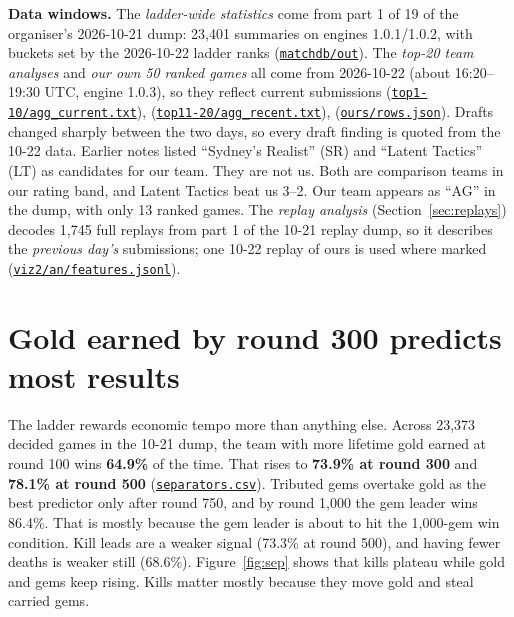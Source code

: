\documentclass[11pt,a4paper]{article}
\newcommand{\scratch}{file:///private/tmp/claude-501/-Users-tristanbasri-Desktop-Code-cambridge-battlecode-s2/b3f4cb6b-e46a-405f-957c-42c44c05c8dc/scratchpad/ladder-data}
\newcommand{\src}[2]{{\small(\href{#1}{\textcolor{cTop}{\texttt{#2}}})}}
\newcommand{\viz}{file:///private/tmp/claude-501/-Users-tristanbasri-Desktop-Code-cambridge-battlecode-s2/b3f4cb6b-e46a-405f-957c-42c44c05c8dc/scratchpad/viz2}
\begin{document}
\vspace{0.6em}
{\small\textbf{Data windows.} The \emph{ladder-wide statistics} come from part 1 of 19 of the organiser's 2026-10-21 dump: 23,401 summaries on engines 1.0.1/1.0.2, with buckets set by the 2026-10-22 ladder ranks \src{\scratch/matchdb/out/}{matchdb/out}. The \emph{top-20 team analyses} and \emph{our own 50 ranked games} all come from 2026-10-22 (about 16:20--19:30 UTC, engine 1.0.3), so they reflect current submissions \src{\scratch/top1-10/agg_current.txt}{top1-10/agg\_current.txt}, \src{\scratch/top11-20/agg_recent.txt}{top11-20/agg\_recent.txt}, \src{\scratch/ours/rows.json}{ours/rows.json}. Drafts changed sharply between the two days, so every draft finding is quoted from the 10-22 data. Earlier notes listed ``Sydney's Realist'' (SR) and ``Latent Tactics'' (LT) as candidates for our team. They are not us. Both are comparison teams in our rating band, and Latent Tactics beat us 3--2. Our team appears as ``AG'' in the dump, with only 13 ranked games. The \emph{replay analysis} (Section~\ref{sec:replays}) decodes 1,745 full replays from part 1 of the 10-21 replay dump, so it describes the \emph{previous day's} submissions; one 10-22 replay of ours is used where marked \src{\viz/an/features.jsonl}{viz2/an/features.jsonl}.}

\tableofcontents

\section{Gold earned by round 300 predicts most results}

The ladder rewards economic tempo more than anything else. Across 23,373 decided games in the 10-21 dump, the team with more lifetime gold earned at round 100 wins \textbf{64.9\%} of the time. That rises to \textbf{73.9\% at round 300} and \textbf{78.1\% at round 500} \src{\scratch/matchdb/out/separators.csv}{separators.csv}. Tributed gems overtake gold as the best predictor only after round 750, and by round 1,000 the gem leader wins 86.4\%. That is mostly because the gem leader is about to hit the 1,000-gem win condition. Kill leads are a weaker signal (73.3\% at round 500), and having fewer deaths is weaker still (68.6\%). Figure~\ref{fig:sep} shows that kills plateau while gold and gems keep rising. Kills matter mostly because they move gold and steal carried gems.
\end{document}
